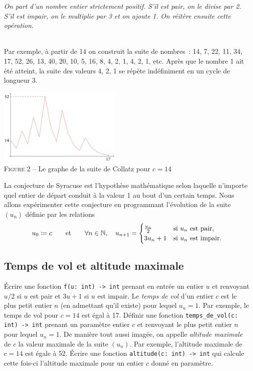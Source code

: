 \documentclass{magnolia}
\begin{document}
\parbox[c]{0.92\linewidth}{\emph{On part d'un nombre entier strictement positif. S'il est pair,
on le divise par 2. S'il est impair, on le multiplie par 3 et on ajoute 1. On réitère ensuite
cette opération.}}\\

Par exemple, à partir de 14 on construit la suite de nombres~: 14, 7, 22, 11, 34, 17, 52, 26,
13, 40, 20, 10, 5, 16, 8, 4, 2, 1, 4, 2, 1, etc. Après que le nombre 1 ait été atteint, la suite
des valeurs 4, 2, 1 se répète indéfiniment en un cycle de longueur 3.

\begin{center}
\includegraphics[width=0.45\textwidth]{../../commun/images/python-tp-collatz}\\
\textsc{Figure 2} -- Le graphe de la suite de Collatz pour $c=14$
\end{center}

La conjecture de Syracuse est l'hypothèse mathématique selon laquelle n'importe quel entier
de départ conduit à la valeur 1 au bout d'un certain temps. Nous allons expérimenter cette
conjecture en programmant l'évolution de la suite $(u_n)$ définie par les relations
\[u_0\coloneqq c\qquad\text{et}\qquad \forall n\in\mathbb{N},\quad
  u_{n+1}=\begin{cases}\frac{u_n}{2} & \text{si $u_n$ est pair,}\\ 3u_n+1 & \text{si $u_n$ est impair.}\end{cases}\]

\subsection{Temps de vol et altitude maximale}

\begin{questions}
\question Écrire une fonction \verb!f(u: int) -> int! prenant en entrée un entier $u$ et renvoyant
  $u/2$ si $u$ est pair et $3u+1$ si $u$ est impair.
\enonce Le \emph{temps de vol} d'un entier $c$ est le plus petit entier $n$ (en admettant qu'il existe) pour lequel
  $u_n=1$. Par exemple, le temps de vol pour $c=14$ est égal à 17.
\question Définir une fonction \verb!temps_de_vol(c: int) -> int! prenant un paramètre entier $c$ et renvoyant
  le plus petit entier $n$ pour lequel $u_n=1$.
\enonce De manière tout aussi imagée, on appelle \emph{altitude maximale} de $c$ la valeur maximale de la suite $(u_n)$.
  Par exemple, l'altitude maximale de $c=14$ est égale à 52.
\question Écrire une fonction \verb!altitude(c: int) -> int! qui calcule cette fois-ci l'altitude maximale pour un
  entier $c$ donné en paramètre.
\end{questions}
\end{document}
